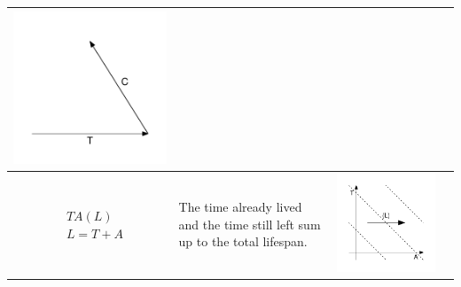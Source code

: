 \documentclass[
  12pt
]{scrartcl}
\begin{document}
\begin{center}
\begin{longtable}{m{}m{}m{}m{}}
  \includegraphics[width = \linewidth]{../fig/CT_iso.pdf}  \\
  \midrule
  $$\begin{aligned}
    &TA(L) \\
    &L = T + A
  \end{aligned}$$ &
  The time already lived and the time still left sum up to the total lifespan. &
  \includegraphics[width = \linewidth]{../fig/TAl.pdf} &

\end{longtable}
\end{center}
\end{document}
